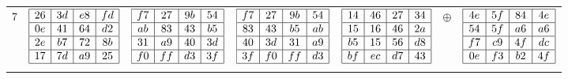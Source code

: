 \begin{longtable}{c c c c c c c}
    7 & 
    $\begin{array}{|c|c|c|c|}
      \hline
      26 & 3d & e8 & fd \\ \hline
      0e & 41 & 64 & d2 \\ \hline
      2e & b7 & 72 & 8b \\ \hline
      17 & 7d & a9 & 25 \\ \hline
    \end{array}$ &
    $\begin{array}{|c|c|c|c|}
      \hline
      f7 & 27 & 9b & 54 \\ \hline
      ab & 83 & 43 & b5 \\ \hline
      31 & a9 & 40 & 3d \\ \hline
      f0 & ff & d3 & 3f \\ \hline
    \end{array}$ &
    $\begin{array}{|c|c|c|c|}
      \hline
      f7 & 27 & 9b & 54 \\ \hline
      83 & 43 & b5 & ab \\ \hline
      40 & 3d & 31 & a9 \\ \hline
      3f & f0 & ff & d3 \\ \hline
    \end{array}$ &
    $\begin{array}{|c|c|c|c|}
      \hline
      14 & 46 & 27 & 34 \\ \hline
      15 & 16 & 46 & 2a \\ \hline
      b5 & 15 & 56 & d8 \\ \hline
      bf & ec & d7 & 43 \\ \hline
    \end{array}$ &
    $\oplus$ &
    $\begin{array}{|c|c|c|c|}
      \hline
      4e & 5f & 84 & 4e \\ \hline
      54 & 5f & a6 & a6 \\ \hline
      f7 & c9 & 4f & dc \\ \hline
      0e & f3 & b2 & 4f \\ \hline
    \end{array}$ \\ \\
    

\end{longtable}
